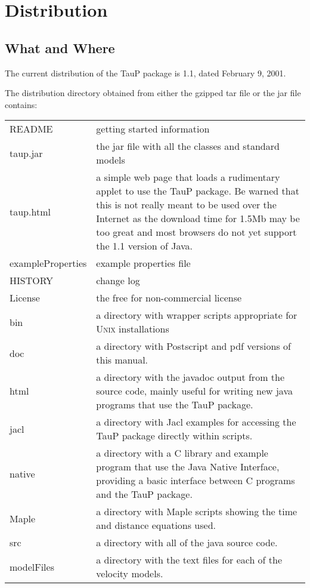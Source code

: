 
\section{Distribution}


\subsection{What and Where}
The current distribution of the TauP package is 1.1, dated February 9, 2001.

The distribution directory obtained from either the gzipped tar file or the jar file contains:

\begin{center}
\begin{tabular}{lp{4in}}
README & getting started information \\
taup.jar & the jar file with all the classes and standard models \\
taup.html & a simple web page that loads a rudimentary applet to use the TauP
package. Be warned that this is not really meant to be used over the Internet
as the download time for 1.5Mb may be too great and most browsers do not yet
support the 1.1 version of Java. \\
exampleProperties & example properties file \\
HISTORY & change log \\
License & the free for non-commercial license \\
bin & a directory with wrapper scripts appropriate for 
\textsc{Unix} installations\\
doc & a directory with Postscript and pdf versions of this manual. \\
html & a directory with the javadoc output from
the source code, mainly useful
for writing new java programs that use the TauP package. \\
jacl & a directory with Jacl examples for accessing the TauP package directly within scripts. \\
native & a directory with a C library and example program that use the
Java Native Interface, providing a basic interface between C programs
and the TauP package. \\
Maple & a directory with Maple scripts showing the time and distance equations
used. \\
src & a directory with all of the java source code. \\
modelFiles & a directory with the text files for each of the velocity models.
\end{tabular}
\end{center}

